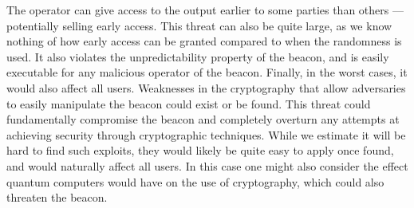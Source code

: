  The operator can give access to the output earlier to some parties than others --- potentially selling early access. This threat can also be quite large, as we know nothing of how early access can be granted compared to when the randomness is used. It also violates the unpredictability property of the beacon, and is easily executable for any malicious operator of the beacon. Finally, in the worst cases, it would also affect all users.
 Weaknesses in the cryptography that allow adversaries to easily manipulate the beacon could exist or be found. This threat could fundamentally compromise the beacon and completely overturn any attempts at achieving security through cryptographic techniques. While we estimate it will be hard to find such exploits, they would likely be quite easy to apply once found, and would naturally affect all users. In this case one might also consider the effect quantum computers would have on the use of cryptography, which could also threaten the beacon.
